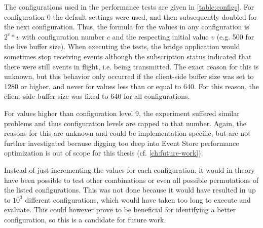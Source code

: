 The configurations used in the performance tests are given in \cref{table:configs}.
For configuration 0 the default settings were used, and then subsequently doubled for the next configuration.
Thus, the formula for the values in any configuration is $ 2^c * v $ with configuration number $c$ and the respecting initial value $v$ (e.g. 500 for the live buffer size).
When executing the tests, the bridge application would sometimes stop receiving events although the subscription status indicated that there were still events in flight, i.e. being transmitted.
The exact reason for this is unknown, but this behavior only occurred if the client-side buffer size was set to 1280 or higher, and never for values less than or equal to 640.
For this reason, the client-side buffer size was fixed to 640 for all configurations.

For values higher than configuration level 9, the experiment suffered similar problems and thus configuration levels are capped to that number.
Again, the reasons for this are unknown and could be implementation-specific, but are not further investigated because digging too deep into Event Store performance optimization is out of scope for this thesis (cf. \cref{ch:future-work}).

Instead of just incrementing the values for each configuration, it would in theory have been possible to test other combinations or even all possible permutations of the listed configurations.
This was not done because it would have resulted in up to $10^3$ different configurations, which would have taken too long to execute and evaluate.
This could however prove to be beneficial for identifying a better configuration, so this is a candidate for future work.

\begin{table}
\caption{Table of all configurations used in the performance tests and their respective settings.}
\centering
{}
\label{table:configs}
\end{table}

